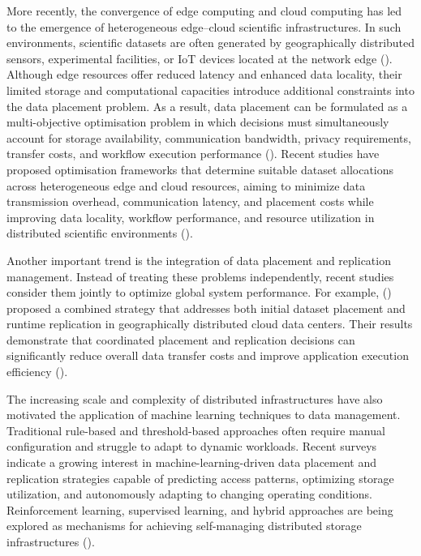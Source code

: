 \documentclass[a4paper,fleqn]{cas-dc}
\begin{document}
More recently, the convergence of edge computing and cloud computing has led to the emergence of heterogeneous edge--cloud scientific infrastructures. In such environments, scientific datasets are often generated by geographically distributed sensors, experimental facilities, or IoT devices located at the network edge (\citealp{du2022scientific}). Although edge resources offer reduced latency and enhanced data locality, their limited storage and computational capacities introduce additional constraints into the data placement problem. As a result, data placement can be formulated as a multi-objective optimisation problem in which decisions must simultaneously account for storage availability, communication bandwidth, privacy requirements, transfer costs, and workflow execution performance (\citealp{adnan2025network}). Recent studies have proposed optimisation frameworks that determine suitable dataset allocations across heterogeneous edge and cloud resources, aiming to minimize data transmission overhead, communication latency, and placement costs while improving data locality, workflow performance, and resource utilization in distributed scientific environments (\citealp{lin2019time,du2021optimal,du2022scientific,Bouhouch2023Dynamic}).

Another important trend is the integration of data placement and replication management. Instead of treating these problems independently, recent studies consider them jointly to optimize global system performance. For example, (\citealp{Bouhouch2023Dynamic}) proposed a combined strategy that addresses both initial dataset placement and runtime replication in geographically distributed cloud data centers. Their results demonstrate that coordinated placement and replication decisions can significantly reduce overall data transfer costs and improve application execution efficiency (\citealp{8406191}).

The increasing scale and complexity of distributed infrastructures have also motivated the application of machine learning techniques to data management. Traditional rule-based and threshold-based approaches often require manual configuration and struggle to adapt to dynamic workloads. Recent surveys \citealp{murimi2025machinelearningdatadrivenreplication} indicate a growing interest in machine-learning-driven data placement and replication strategies capable of predicting access patterns, optimizing storage utilization, and autonomously adapting to changing operating conditions. Reinforcement learning, supervised learning, and hybrid approaches are being explored as mechanisms for achieving self-managing distributed storage infrastructures (\citealp{rasool2007comparative,lin2019time, 10763884}).
\end{document}

